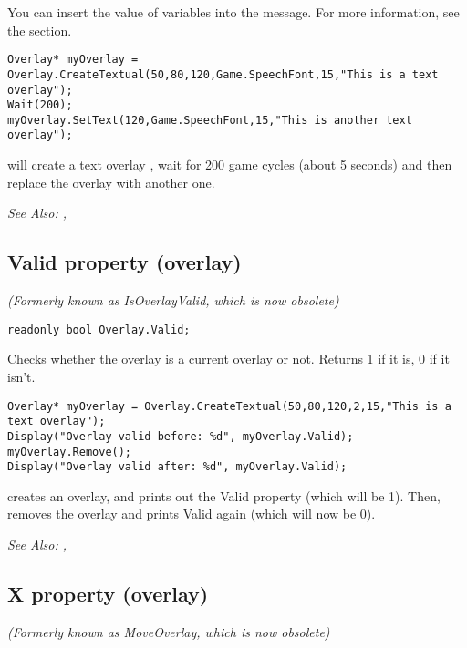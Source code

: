 You can insert the value of variables into the message. For more information,
see the  section.

\begin{verbatim}
Overlay* myOverlay = Overlay.CreateTextual(50,80,120,Game.SpeechFont,15,"This is a text overlay");
Wait(200);
myOverlay.SetText(120,Game.SpeechFont,15,"This is another text overlay");
\end{verbatim}
will create a text overlay , wait for 200 game cycles (about 5 seconds) and then
replace the overlay with another one.

\it{See Also:} ,


\subsection{Valid property (overlay)}\label{Overlay.Valid}%

\it{(Formerly known as IsOverlayValid, which is now obsolete)}

\begin{verbatim}
readonly bool Overlay.Valid;
\end{verbatim}
Checks whether the overlay is a current overlay or not.
Returns 1 if it is, 0 if it isn't.

\begin{verbatim}
Overlay* myOverlay = Overlay.CreateTextual(50,80,120,2,15,"This is a text overlay");
Display("Overlay valid before: %d", myOverlay.Valid);
myOverlay.Remove();
Display("Overlay valid after: %d", myOverlay.Valid);
\end{verbatim}
creates an overlay, and prints out the Valid property (which will be 1). Then, removes
the overlay and prints Valid again (which will now be 0).

\it{See Also:} ,



\subsection{X property (overlay)}\label{Overlay.X}%

\it{(Formerly known as MoveOverlay, which is now obsolete)}

